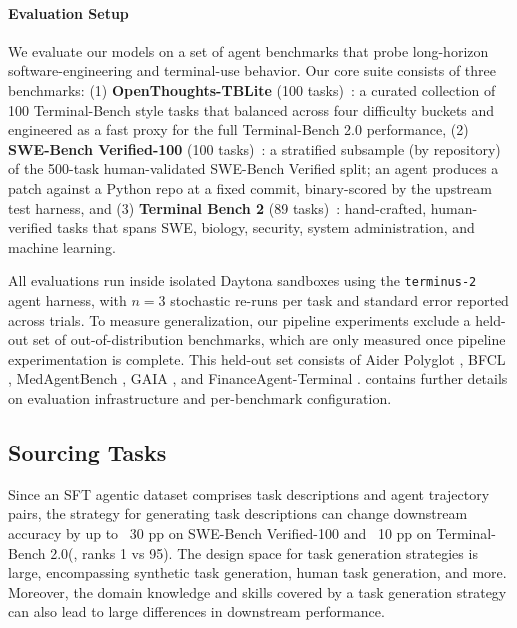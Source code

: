 \documentclass{llmxive}
\begin{document}
\paragraph{Evaluation Setup} 
We evaluate our models on a set of agent benchmarks that probe long-horizon software-engineering and terminal-use behavior. Our core suite consists of three benchmarks: (1) \textbf{OpenThoughts-TBLite} (100 tasks)~\citep{OpenThoughts-TBLite}: a curated collection of 100 Terminal-Bench style tasks that balanced across four difficulty buckets and engineered as a fast proxy for the full Terminal-Bench 2.0 performance, (2) \textbf{SWE-Bench Verified-100} (100 tasks)~\citep{jimenez2024swebenchlanguagemodelsresolve}: a stratified subsample (by repository) of the 500-task human-validated SWE-Bench Verified split; an agent produces a patch against a Python repo at a fixed commit, binary-scored by the upstream test harness, and (3) \textbf{Terminal Bench 2} (89 tasks)~\citep{merrill2026terminalbenchbenchmarkingagentshard}: hand-crafted, human-verified tasks that spans SWE, biology, security, system administration, and machine learning.

All evaluations run inside isolated Daytona sandboxes \citep{Daytona_Infrastructure_2025} using the \texttt{terminus-2} \citep{merrill2026terminalbenchbenchmarkingagentshard} agent harness, with $n=3$ stochastic re-runs per task and standard error reported across trials. To measure generalization, our pipeline experiments exclude a held-out set of out-of-distribution benchmarks, which are only measured once pipeline experimentation is complete. This held-out set consists of Aider Polyglot \citep{aiderpolyglot2024}, BFCL \citep{patil2025bfcl}, MedAgentBench \citep{jiang2025medagentbench}, GAIA \citep{mialon2023gaia}, and FinanceAgent-Terminal \citep{valsai2024financeagent}.  contains further details on evaluation infrastructure and per-benchmark configuration.

\subsection{Sourcing Tasks}
\label{sec:task_generation_ablation}

Since an SFT agentic dataset comprises task descriptions and agent trajectory pairs, the strategy for generating task descriptions can change downstream accuracy by up to ~30 pp on SWE-Bench Verified-100 and ~10 pp on Terminal-Bench 2.0(, ranks 1 vs 95). The design space for task generation strategies is large, encompassing synthetic task generation, human task generation, and more. Moreover, the domain knowledge and skills covered by a task generation strategy can also lead to large differences in downstream performance.
\end{document}
